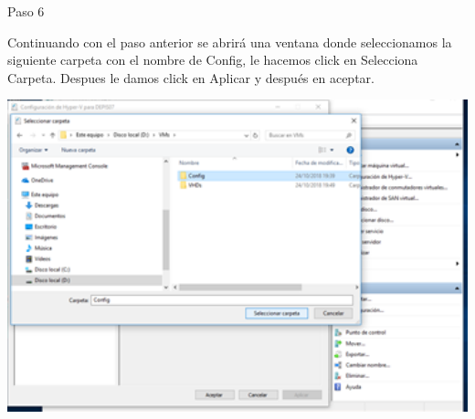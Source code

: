 	\begin{itemize}
	\begin{center}
   	 Paso 6
	\end{center}


 	   Continuando con el paso anterior se abrirá una ventana donde seleccionamos la siguiente carpeta con el nombre de Config, le hacemos click en Selecciona Carpeta. Despues le damos click en Aplicar y después en aceptar. \\
	\begin{center}
	\includegraphics[width=15cm]{./Imagenes/imagen6} 
	\end{center}


	\end{itemize} 


  
  
  

